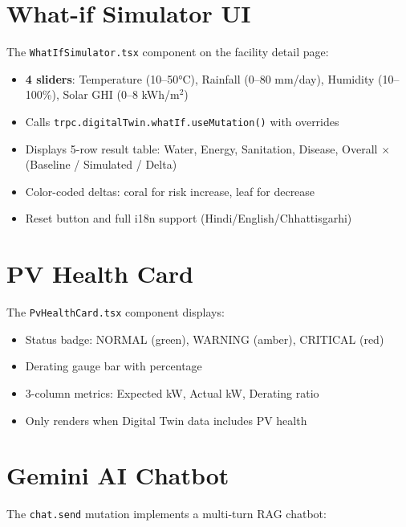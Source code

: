 \documentclass[12pt,a4paper]{report}
\begin{document}
\section{What-if Simulator UI}

The \texttt{WhatIfSimulator.tsx} component on the facility detail page:

\begin{itemize}[nosep]
  \item \textbf{4 sliders}: Temperature (10--50°C), Rainfall (0--80 mm/day), Humidity (10--100\%), Solar GHI (0--8 kWh/m$^2$)
  \item Calls \texttt{trpc.digitalTwin.whatIf.useMutation()} with overrides
  \item Displays 5-row result table: Water, Energy, Sanitation, Disease, Overall $\times$ (Baseline / Simulated / Delta)
  \item Color-coded deltas: coral for risk increase, leaf for decrease
  \item Reset button and full i18n support (Hindi/English/Chhattisgarhi)
\end{itemize}

\section{PV Health Card}

The \texttt{PvHealthCard.tsx} component displays:
\begin{itemize}[nosep]
  \item Status badge: NORMAL (green), WARNING (amber), CRITICAL (red)
  \item Derating gauge bar with percentage
  \item 3-column metrics: Expected kW, Actual kW, Derating ratio
  \item Only renders when Digital Twin data includes PV health
\end{itemize}

\section{Gemini AI Chatbot}

The \texttt{chat.send} mutation implements a multi-turn RAG chatbot:
\end{document}
